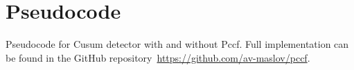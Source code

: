 \section{Pseudocode}\label{sec:pseudo_code}
Pseudocode for Cusum detector with and without Pccf.
Full implementation can be found in the GitHub repository~\href{https://github.com/av-maslov/pccf}{https://github.com/av-maslov/pccf}.


%
%
%
%
%
%

